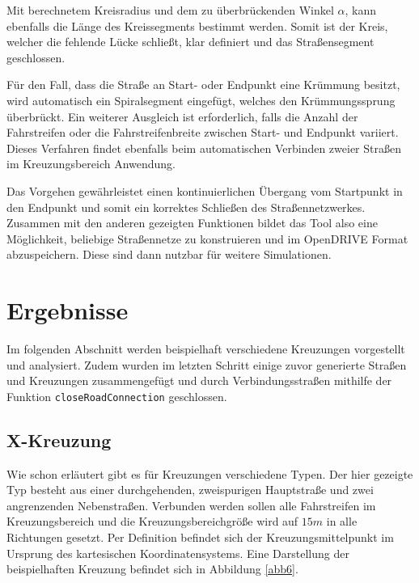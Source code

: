 Mit berechnetem Kreisradius und dem zu überbrückenden Winkel \(\alpha\), kann ebenfalls die Länge des Kreissegments bestimmt werden. Somit ist der Kreis, welcher die fehlende Lücke schließt, klar definiert und das Straßensegment geschlossen.

Für den Fall, dass die Straße an Start- oder Endpunkt eine Krümmung besitzt, wird automatisch ein Spiralsegment eingefügt, welches den Krümmungssprung überbrückt. Ein weiterer Ausgleich ist erforderlich, falls die Anzahl der Fahrstreifen oder die Fahrstreifenbreite zwischen Start- und Endpunkt variiert. Dieses Verfahren findet ebenfalls beim automatischen Verbinden zweier Straßen im Kreuzungsbereich Anwendung.

Das Vorgehen gewährleistet einen kontinuierlichen Übergang vom Startpunkt in den Endpunkt und somit ein korrektes Schließen des Straßennetzwerkes. Zusammen mit den anderen gezeigten Funktionen bildet das Tool also eine Möglichkeit, beliebige Straßennetze zu konstruieren und im OpenDRIVE Format abzuspeichern. Diese sind dann nutzbar für weitere Simulationen.

\newpage %

\chapter{Ergebnisse}

Im folgenden Abschnitt werden beispielhaft verschiedene Kreuzungen vorgestellt und analysiert. Zudem wurden im letzten Schritt einige zuvor generierte Straßen und Kreuzungen zusammengefügt und durch Verbindungsstraßen mithilfe der Funktion \texttt{closeRoadConnection} geschlossen.

\section{X-Kreuzung}
Wie schon erläutert gibt es für Kreuzungen verschiedene Typen. Der hier gezeigte Typ besteht aus einer durchgehenden, zweispurigen Hauptstraße und zwei angrenzenden Nebenstraßen. Verbunden werden sollen alle Fahrstreifen im Kreuzungsbereich und die Kreuzungsbereichgröße wird auf \(15 m\) in alle Richtungen gesetzt. Per Definition befindet sich der Kreuzungsmittelpunkt im Ursprung des kartesischen Koordinatensystems. Eine Darstellung der beispielhaften Kreuzung befindet sich in Abbildung \ref{abb6}.

